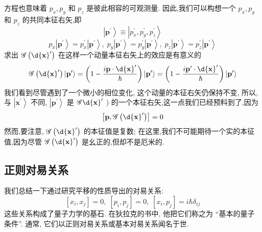 	方程也意味着 ${p}_{x},{p}_{y}$ 和 ${p}_{z}$ 是彼此相容的可观测量. 因此,我们可以构想一个 ${p}_{x},{p}_{y}$ 和 ${p}_{z}$ 的共同本征右矢,即
	\begin{equation}
		\left| {\mathbf{p}}^{\prime }\right\rangle \equiv \left| {{p}_{x}^{\prime },{p}_{y}^{\prime },{p}_{z}^{\prime }}\right\rangle
	\end{equation}
	\begin{equation}
		{p}_{x}\left| {\mathbf{p}}^{\prime }\right\rangle = {p}_{x}^{\prime }\left| {\mathbf{p}}^{\prime }\right\rangle ,\;{p}_{y}\left| {\mathbf{p}}^{\prime }\right\rangle = {p}_{y}^{\prime }\left| {\mathbf{p}}^{\prime }\right\rangle ,\;{p}_{z}\left| {\mathbf{p}}^{\prime }\right\rangle = {p}_{z}^{\prime }\left| {\mathbf{p}}^{\prime }\right\rangle
	\end{equation}
	求出 $\mathscr{G} \left( {\d{\mathbf{x}}^{\prime }}\right)$ 在这样一个动量本征右矢上的效应是有意义的
	\begin{equation}
		\mathscr{G}\left( {\d{\mathbf{x}}^{\prime }}\right) \left| {\mathbf{p}}^{\prime }\right\rangle = \left( {1 - \frac{i\mathbf{p} \cdot \d{\mathbf{x}}^{\prime }}{\hbar }}\right) \left| {\mathbf{p}}^{\prime }\right\rangle = \left( {1 - \frac{i{\mathbf{p}}^{\prime } \cdot \d{\mathbf{x}}^{\prime }}{\hbar }}\right) \left| {\mathbf{p}}^{\prime }\right\rangle
	\end{equation}
	我们看到尽管遇到了一个微小的相位变化, 这个动量的本征右矢仍保持不变, 所以, 与 $\left| {\mathbf{x}}^{\prime }\right\rangle$ 不同, $\left| {\mathbf{p}}^{\prime }\right\rangle$ 是 $\mathscr{G}\d{\mathbf{x}}^{\prime }$ ) 的一个本征右矢,这一点我们已经预料到了,因为
	\begin{equation}
		\left\lbrack {\mathbf{p},\mathscr{G}\left( {\d{\mathbf{x}}^{\prime }}\right) }\right\rbrack = 0
	\end{equation}
	然而,要注意, $\mathscr{G} \left( {\d{\mathbf{x}}^{\prime }}\right)$ 的本征值是复数; 在这里,我们不可能期待一个实的本征值,因为尽管 $\mathscr{G} \left( {\d{\mathbf{x}}^{\prime }}\right)$ 是幺正的,但却不是厄米的.
	\subsection{正则对易关系}
	我们总结一下通过研究平移的性质导出的对易关系:
	\begin{equation}
		\left\lbrack {{x}_{i},{x}_{j}}\right\rbrack = 0,\;\left\lbrack {{p}_{i},{p}_{j}}\right\rbrack = 0,\;\left\lbrack {{x}_{i},{p}_{j}}\right\rbrack = i\hbar {\delta }_{ij}
	\end{equation}
	这些关系构成了量子力学的基石. 在狄拉克的书中, 他把它们称之为 “基本的量子条件”. 通常, 它们以正则对易关系或基本对易关系闻名于世.
	

